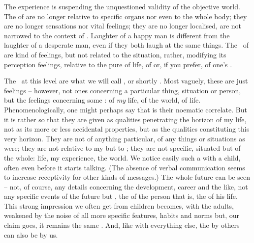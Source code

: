 The experience  is  suspending the unquestioned
validity of the objective world.  The  of  are no longer
relative to specific organs nor even to the whole body; they are no longer
sensations nor vital feelings; they are no longer localised, are not narrowed to
the context of . Laughter of a happy man is different from the
laughter of a desperate man, even if they both laugh at the same things. 
The \oss\ of  are kind of feelings, but not related to
the  situation, rather, modifying its perception 
  feelings, relative to the pure
 of life, of  or, if you prefer, of one's .


The \oss\ at this level are what we will call , or
shortly .  Most vaguely, these are just feelings -- however,
not ones concerning a particular thing, situation or person, but the feelings
concerning some : of {\em my} life, of the world, of life.
Phenomenologically, one might perhaps say that  is their noematic
correlate. But it is rather so that they are given as qualities penetrating the
horizon of my life, not as its more or less accidental properties, but as
the qualities constituting this very horizon.  They are not  of
anything particular, of any things or situations as  were; they
are not relative to my  but to ; they are not specific,
situated  but  of the whole: life, my experience, the
world. We notice easily such a  with a child, often even before it
starts talking. (The absence of verbal communication seems to increase
receptivity for other kinds of messages.) The whole future can be seen -- not,
of course, any details concerning the development, career and the like, not any
specific events of the future but , 
the  of the person 
that is, the  of his life.
This strong impression we often get from 
children becomes, with the adults, weakened by the noise of all more specific
features, habits and norms but, our claim goes, it remains the same
. And, like with everything else, the  by
others can also be  by us. 

